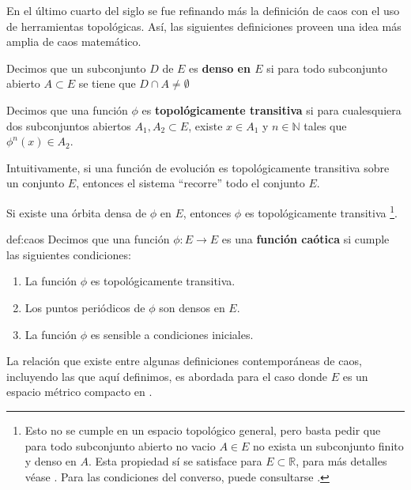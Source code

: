 \documentclass[../Main.tex]{subfiles}
\begin{document}
 En el último cuarto del siglo se fue refinando más la definición de caos con el uso de herramientas topológicas. Así, las siguientes definiciones proveen una idea más amplia de caos matemático.  
 \begin{definition}{}{}
     Decimos que un subconjunto $D$ de $E$ es \textbf{denso en $E$} si para todo subconjunto abierto $A\subset E$ se tiene que $D\cap A\neq \emptyset$
 \end{definition}
\begin{definition}{}{}
    Decimos que una función $\phi$ es \textbf{topológicamente transitiva} si para cualesquiera dos subconjuntos abiertos $A_1,A_2\subset E$, existe $x\in A_1$ y $n\in \mathbb{N}$ tales que $\phi^n(x)\in A_2$.
\end{definition}
\begin{remark}{}{}
Intuitivamente, si una función de evolución es topológicamente transitiva sobre un conjunto $E$, entonces el sistema ``recorre'' todo el conjunto $E$.
\end{remark}
\begin{remark}{}{}
    Si existe una órbita densa de $\phi$ en $E$, entonces $\phi$ es topológicamente transitiva \footnote{Esto no se cumple en un espacio topológico general, pero basta pedir que para todo subconjunto abierto no vacio $A\in E$ no exista un subconjunto finito y denso en $A$. Esta propiedad sí se satisface para $E\subset \mathbb{R}$, para más detalles véase \cite{Degirmenci2003}. Para las condiciones del converso, puede consultarse \cite{KingMendez2014}.}. 
\end{remark}
\begin{definition}{}{def:caos}
    Decimos que una función $\phi:E\rightarrow E$ es una \textbf{función caótica}\cite{devaney2021} si cumple las siguientes condiciones:
    \begin{enumerate}
            \item La función $\phi$ es topológicamente transitiva.
        \item Los puntos periódicos de $\phi$ son densos en $E$.
        \item La función $\phi$ es sensible a condiciones iniciales. 
    \end{enumerate}
\end{definition}

La relación que existe entre algunas definiciones contemporáneas de caos, incluyendo las que aquí definimos, es abordada para el caso donde $E$ es un espacio métrico compacto en \cite{Aulbach2001}.
\end{document}
